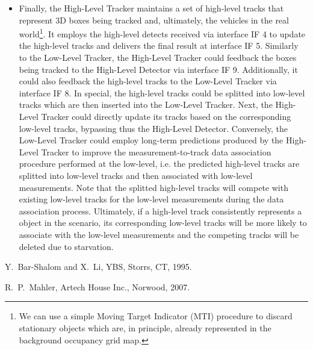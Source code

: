 \documentclass[letterpaper]{article}
\begin{document}
\begin{itemize}
\item Finally, the High-Level Tracker maintains a set of high-level tracks that represent 3D boxes being tracked and, ultimately, the vehicles in the real world\footnote{We can use a simple Moving Target Indicator (MTI) procedure to discard stationary objects which are, in principle, already represented in the background occupancy grid map.}. It employs the high-level detects received via interface IF 4 to update the high-level tracks and delivers the final result at interface IF 5. Similarly to the Low-Level Tracker, the High-Level Tracker could feedback the boxes being tracked to the High-Level Detector via interface IF 9. Additionally, it could also feedback the high-level tracks to the Low-Level Tracker via interface IF 8. In special, the high-level tracks could be splitted into low-level tracks which are then inserted into the Low-Level Tracker. Next, the High-Level Tracker could directly update its tracks based on the corresponding low-level tracks, bypassing thus the High-Level Detector. Conversely, the Low-Level Tracker could employ long-term predictions produced by the High-Level Tracker to improve the measurement-to-track data association procedure performed at the low-level, i.e. the predicted high-level tracks are splitted into low-level tracks and then associated with low-level measurements. Note that the splitted high-level tracks will compete with existing low-level tracks for the low-level measurements during the data association process. Ultimately, if a high-level track consistently represents a object in the scenario, its corresponding low-level tracks will be more likely to associate with the low-level measurements and the competing tracks will be deleted due to starvation.
\end{itemize}

\begin{thebibliography}{}
{
 Y.~Bar-Shalom and X.~Li,
 YBS, Storrs, CT, 1995.

 R.~P.~Mahler,
 Artech House Inc., Norwood, 2007.
}
\end{thebibliography}

\end{document}

